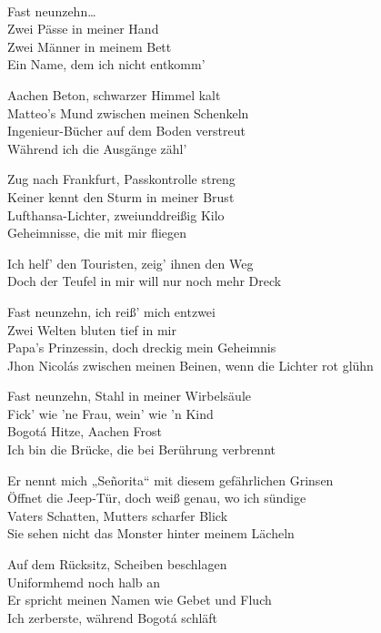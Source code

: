 \begin{lyrics}

\\
Fast neunzehn…\\
Zwei Pässe in meiner Hand\\
Zwei Männer in meinem Bett\\
Ein Name, dem ich nicht entkomm’

Aachen Beton, schwarzer Himmel kalt\\
Matteo’s Mund zwischen meinen Schenkeln\\
Ingenieur-Bücher auf dem Boden verstreut\\
Während ich die Ausgänge zähl’

Zug nach Frankfurt, Passkontrolle streng\\
Keiner kennt den Sturm in meiner Brust\\
Lufthansa-Lichter, zweiunddreißig Kilo\\
Geheimnisse, die mit mir fliegen

Ich helf’ den Touristen, zeig’ ihnen den Weg\\
Doch der Teufel in mir will nur noch mehr Dreck

Fast neunzehn, ich reiß’ mich entzwei\\
Zwei Welten bluten tief in mir\\
Papa’s Prinzessin, doch dreckig mein Geheimnis\\
Jhon Nicolás zwischen meinen Beinen, wenn die Lichter rot glühn

Fast neunzehn, Stahl in meiner Wirbelsäule\\
Fick’ wie ’ne Frau, wein’ wie ’n Kind\\
Bogotá Hitze, Aachen Frost\\
Ich bin die Brücke, die bei Berührung verbrennt

Er nennt mich „Señorita“ mit diesem gefährlichen Grinsen\\
Öffnet die Jeep-Tür, doch weiß genau, wo ich sündige\\
Vaters Schatten, Mutters scharfer Blick\\
Sie sehen nicht das Monster hinter meinem Lächeln

Auf dem Rücksitz, Scheiben beschlagen\\
Uniformhemd noch halb an\\
Er spricht meinen Namen wie Gebet und Fluch\\
Ich zerberste, während Bogotá schläft


\end{lyrics}
